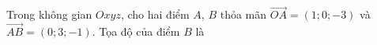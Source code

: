 \begin{ex}
Trong không gian $Oxyz$, cho hai điểm $A$, $B$ thỏa mãn $\overrightarrow{OA}=(1;0;-3)$ và $\overrightarrow{AB}=(0;3;-1)$. Tọa độ của điểm $B$ là
\end{ex}
